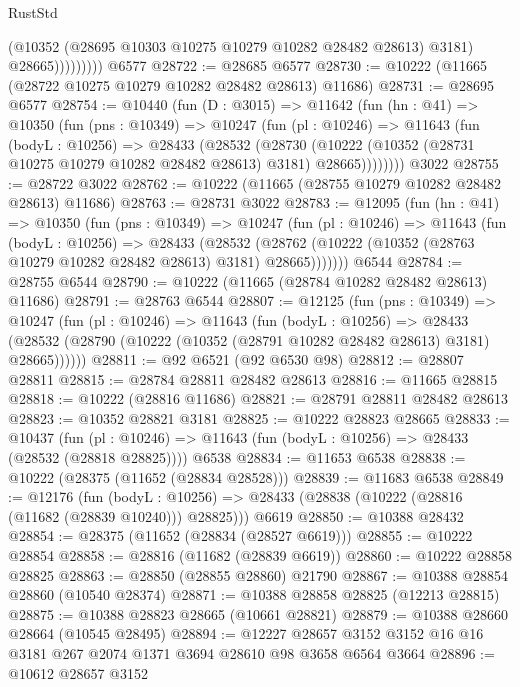 \begin{lexlean}{RustStd}
\begin{coremodule}
                      (@10352 (@28695 @10303 @10275 @10279 @10282 @28482 @28613) @3181)
                      @28665)))))))))
    @6577
@28722 := @28685 @6577
@28730 := @10222 (@11665 (@28722 @10275 @10279 @10282 @28482 @28613) @11686)
@28731 := @28695 @6577
@28754 := @10440
    (fun (D : @3015) =>
    @11642
      (fun (hn : @41) =>
      @10350
        (fun (pns : @10349) =>
        @10247
          (fun (pl : @10246) =>
          @11643
            (fun (bodyL : @10256) =>
            @28433
              (@28532
                (@28730
                  (@10222 (@10352 (@28731 @10275 @10279 @10282 @28482 @28613) @3181) @28665))))))))
    @3022
@28755 := @28722 @3022
@28762 := @10222 (@11665 (@28755 @10279 @10282 @28482 @28613) @11686)
@28763 := @28731 @3022
@28783 := @12095
    (fun (hn : @41) =>
    @10350
      (fun (pns : @10349) =>
      @10247
        (fun (pl : @10246) =>
        @11643
          (fun (bodyL : @10256) =>
          @28433
            (@28532
              (@28762 (@10222 (@10352 (@28763 @10279 @10282 @28482 @28613) @3181) @28665)))))))
    @6544
@28784 := @28755 @6544
@28790 := @10222 (@11665 (@28784 @10282 @28482 @28613) @11686)
@28791 := @28763 @6544
@28807 := @12125
    (fun (pns : @10349) =>
    @10247
      (fun (pl : @10246) =>
      @11643
        (fun (bodyL : @10256) =>
        @28433 (@28532 (@28790 (@10222 (@10352 (@28791 @10282 @28482 @28613) @3181) @28665))))))
@28811 := @92 @6521 (@92 @6530 @98)
@28812 := @28807 @28811
@28815 := @28784 @28811 @28482 @28613
@28816 := @11665 @28815
@28818 := @10222 (@28816 @11686)
@28821 := @28791 @28811 @28482 @28613
@28823 := @10352 @28821 @3181
@28825 := @10222 @28823 @28665
@28833 := @10437
    (fun (pl : @10246) => @11643 (fun (bodyL : @10256) => @28433 (@28532 (@28818 @28825))))
    @6538
@28834 := @11653 @6538
@28838 := @10222 (@28375 (@11652 (@28834 @28528)))
@28839 := @11683 @6538
@28849 := @12176
    (fun (bodyL : @10256) => @28433 (@28838 (@10222 (@28816 (@11682 (@28839 @10240))) @28825)))
    @6619
@28850 := @10388 @28432
@28854 := @28375 (@11652 (@28834 (@28527 @6619)))
@28855 := @10222 @28854
@28858 := @28816 (@11682 (@28839 @6619))
@28860 := @10222 @28858 @28825
@28863 := @28850 (@28855 @28860) @21790
@28867 := @10388 @28854 @28860 (@10540 @28374)
@28871 := @10388 @28858 @28825 (@12213 @28815)
@28875 := @10388 @28823 @28665 (@10661 @28821)
@28879 := @10388 @28660 @28664 (@10545 @28495)
@28894 := @12227
    @28657
    @3152
    @3152
    @16
    @16
    @3181
    @267
    @2074
    @1371
    @3694
    @28610
    @98
    @3658
    @6564
    @3664
@28896 := @10612 @28657 @3152

\end{coremodule}
\end{lexlean}
